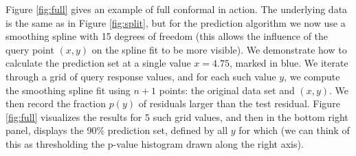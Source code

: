 \documentclass{article}
\begin{document}
Figure \ref{fig:full} gives an example of full conformal in action. The
underlying data is the same as in Figure \ref{fig:split}, but for the prediction
algorithm we now use a smoothing spline with 15 degrees of freedom (this allows
the influence of the query point $(x,y)$ on the spline fit to be more
visible). We demonstrate how to calculate the prediction set at a single value
$x=4.75$, marked in blue. We iterate through a grid of query response values,
and for each such value $y$, we compute the smoothing spline fit using $n+1$
points: the original data set and $(x,y)$. We then record the fraction $p(y)$ of
residuals larger than the test residual. Figure \ref{fig:full} visualizes the
results for 5 such grid values, and then in the bottom right panel, displays the
90\% prediction set, defined by all $y$ for which  (we can think of this as thresholding
the p-value histogram drawn along the right axis).
\end{document}

